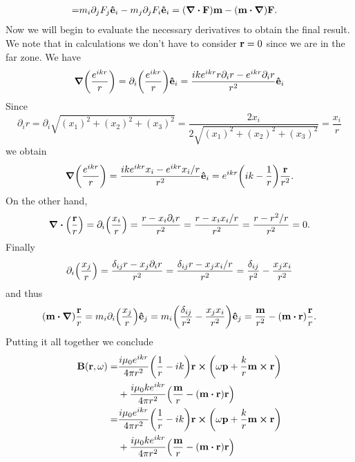 \documentclass{article}
\begin{document}
\begin{enumerate}[(i)]
\begin{align}
\begin{split}
=&m_i\partial_jF_j\vu{e}_i-m_j\partial_jF_i\vu{e}_i=(\div{\vb{F}})\vb{m}-(\vb{m}\vdot\grad)\vb{F}.
\end{split}
\end{align}
Now we will begin to evaluate the necessary derivatives to obtain the final result. We note that in calculations we don't have to consider $\vb{r}=0$ since we are in the far zone. We have
\begin{equation}
\grad(\frac{e^{ikr}}{r})=\partial_i\qty(\frac{e^{ikr}}{r})\vu{e}_i=\frac{ike^{ikr}r\partial_ir-e^{ikr}\partial_ir}{r^2}\vu{e}_i
\end{equation}
Since
\begin{equation}
\partial_ir=\partial_i\sqrt{(x_1)^2+(x_2)^2+(x_3)^2}=\frac{2x_i}{2\sqrt{(x_1)^2+(x_2)^2+(x_3)^2}}=\frac{x_i}{r}
\end{equation}
we obtain
\begin{equation}
\grad(\frac{e^{ikr}}{r})=\frac{ike^{ikr}x_i-e^{ikr}x_i/r}{r^2}\vu{e}_i=e^{ikr}\qty(ik-\frac{1}{r})\frac{\vb{r}}{r^2}.
\end{equation}
On the other hand, 
\begin{equation}
\div(\frac{\vb{r}}{r})=\partial_i\qty(\frac{x_i}{r})=\frac{r-x_i\partial_ir}{r^2}=\frac{r-x_ix_i/r}{r^2}=\frac{r-r^2/r}{r^2}=0.
\end{equation}
Finally
\begin{equation}
\partial_i\qty(\frac{x_j}{r})=\frac{\delta_{ij}r-x_j\partial_ir}{r^2}=\frac{\delta_{ij}r-x_jx_i/r}{r^2}=\frac{\delta_{ij}}{r^2}-\frac{x_jx_i}{r^2}
\end{equation}
and thus
\begin{equation}
(\vb{m}\vdot\grad)\frac{\vb{r}}{r}=m_i\partial_i\qty(\frac{x_j}{r})\vu{e}_j=m_i\qty(\frac{\delta_{ij}}{r^2}-\frac{x_jx_i}{r^2})\vu{e}_j=\frac{\vb{m}}{r^2}-(\vb{m}\vdot\vb{r})\frac{\vb{r}}{r}.
\end{equation}
Putting it all together we conclude
\begin{align}
\begin{split}
\vb{B}(\vb{r},\omega)=&\frac{i\mu_0e^{ikr}}{4\pi r^2}\qty(\frac{1}{r}-ik)\vb{r}\cross\qty(\omega\vb{p}+\frac{k}{r}\vb{m}\cross\vb{r})\\
&+\frac{i\mu_0ke^{ikr}}{4\pi r^2}\qty(\frac{\vb{m}}{r}-(\vb{m}\vdot\vb{r})\vb{r})\\
=&\frac{i\mu_0e^{ikr}}{4\pi r^2}\qty(\frac{1}{r}-ik)\vb{r}\cross\qty(\omega\vb{p}+\frac{k}{r}\vb{m}\cross\vb{r})\\
&+\frac{i\mu_0ke^{ikr}}{4\pi r^2}\qty(\frac{\vb{m}}{r}-(\vb{m}\vdot\vb{r})\vb{r})
\end{split}
\end{align}


\end{enumerate}
\end{document}
